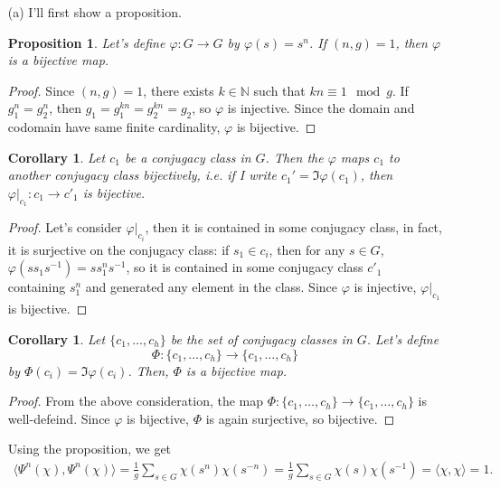 \documentclass[a4paper, 12pt]{article}
\theoremstyle{Mydefinition}
\theoremstyle{Mytheorem}
\newtheorem{corollary}[statement]{Corollary}
\newtheorem{proposition}[statement]{Proposition}
\begin{document}
\begin{enumerate}
    \item[(a)]I'll first show a proposition.
\begin{proposition}\label{HW10:Prop:1}
Let's define $\varphi:G\rightarrow G$ by $\varphi(s) = s^n$. If $(n,g)=1$, then $\varphi$ is a bijective map.
\end{proposition}
\begin{proof}
Since $(n,g)=1$, there exists $k\in \mathbb{N}$ such that $kn\equiv 1\mod g$. If $g_1^n = g_2^n$, then $g_1=g_1^{kn}=g_2^{kn}=g_2$, so $\varphi$ is injective. Since the domain and codomain have same finite cardinality, $\varphi$ is bijective.
\end{proof}
\begin{corollary}\label{HW10:Cor:1}
Let $c_1$ be a conjugacy class in $G$. Then the $\varphi$ maps $c_1$ to another conjugacy class bijectively, i.e. if I write $c_1' = \Im\varphi(c_1)$, then $\varphi|_{c_1}:c_1\rightarrow c'_1$ is bijective.
\end{corollary}
\begin{proof}
Let's consider $\varphi|_{c_i}$, then it is contained in some conjugacy class, in fact, it is surjective on the conjugacy class: if $s_1\in c_i$, then for any $s\in G$, $\varphi(ss_1s^{-1}) = ss_1^ns^{-1}$, so it is contained in some conjugacy class $c'_1$ containing $s_1^n$ and generated any element in the class. Since $\varphi$ is injective, $\varphi|_{c_1}$ is bijective.
\end{proof}
\begin{corollary}\label{HW10:Cor:2}
Let $\{c_1, \ldots, c_h\}$ be the set of conjugacy classes in $G$. Let's define \begin{equation}
    \Phi:\{c_1, \ldots, c_h\}\rightarrow \{c_1, \ldots, c_h\}
\end{equation}
by $\Phi(c_i) = \Im\varphi(c_i)$. Then, $\Phi$ is a bijective map.
\end{corollary}
\begin{proof}
From the above consideration, the map $\Phi:\{c_1, \ldots, c_h\}\rightarrow \{c_1, \ldots, c_h\}$ is well-defeind. Since $\varphi$ is bijective, $\Phi$ is again surjective, so bijective.
\end{proof}
Using the proposition, we get
\begin{equation}
\begin{split}
    \langle \Psi^n(\chi),\Psi^n(\chi)\rangle = \frac{1}{g}\sum_{s\in G}\chi(s^n)\chi(s^{-n}) = \frac{1}{g}\sum_{s\in G}\chi(s)\chi(s^{-1}) = \langle \chi, \chi\rangle = 1.

\end{split}
\end{equation}
\end{enumerate}
\end{document}
